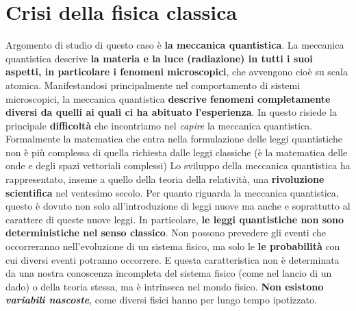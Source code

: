 \documentclass[a4paper,12pt,oneside]{book}
\newcommand*{\myfont}{\fontfamily{ppl}\selectfont}
\begin{document}
\fancypagestyle{plain}{%
\fancyhf{} %
\fancyfoot[C]{\bfseries \myfont{\thepage}} %
\renewcommand{\headrulewidth}{0pt}
\renewcommand{\footrulewidth}{0pt}}

\fancypagestyle{VS}{
\headheight = 15pt
\lhead[\myfont{\textit{\textbf{\thechapter\nouppercase{\leftmark}}}}]{\myfont{\textit{\textbf{\nouppercase{\leftmark}}}}}
\chead[]{}
\rhead[\myfont{\textbf{\thepage}}]{\myfont{\textbf{\thepage}}}

\lfoot[]{}
\cfoot[]{}
\rfoot[]{}
}



\pagestyle{VS}
\chapter{Crisi della fisica classica}
Argomento di studio di questo caso è \textbf{la meccanica quantistica}.
La meccanica quantistica descrive \textbf{la materia e la luce (radiazione) in tutti i suoi aspetti, in particolare i fenomeni microscopici}, che avvengono cioè su scala atomica.
Manifestandosi principalmente nel comportamento di sistemi microscopici, la meccanica quantistica \textbf{descrive fenomeni completamente diversi da quelli ai quali ci ha abituato l'esperienza}. In questo risiede la principale \textbf{difficoltà} che incontriamo nel \textit{capire} la meccanica quantistica. Formalmente la matematica che entra nella formulazione delle leggi quantistiche non è più complessa di quella richiesta dalle leggi classiche (è la matematica delle onde e degli spazi vettoriali complessi)
Lo sviluppo della meccanica quantistica ha rappresentato, inseme a quello della teoria della relatività, una \textbf{rivoluzione scientifica} nel ventesimo secolo. Per quanto riguarda la meccanica quantistica, questo è dovuto non solo all'introduzione di leggi nuove ma anche e soprattutto al carattere di queste nuove leggi. In particolare, \textbf{le leggi quantistiche non sono deterministiche nel senso classico}. Non possono prevedere gli eventi che occorreranno nell'evoluzione di un sistema fisico, ma solo le \textbf{le probabilità} con cui diversi eventi potranno occorrere. E questa caratteristica non è determinata da una nostra conoscenza incompleta del sistema fisico (come nel lancio di un dado) o della teoria stessa, ma è intrinseca nel mondo fisico. \textbf{Non esistono \textit{variabili nascoste}}, come diversi fisici hanno per lungo tempo ipotizzato.\\
\end{document}
